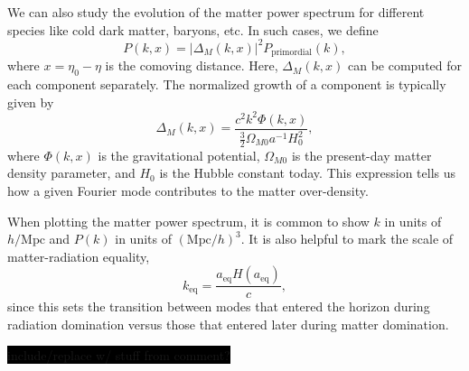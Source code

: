 \documentclass{aa}
\numberwithin{equation}{section}
\numberwithin{table}{section}
\numberwithin{figure}{section}
\begin{document}
We can also study the evolution of the matter power spectrum for different species like cold dark matter, baryons, etc. In such cases, we define
\begin{equation}
P(k, x) = |\Delta_M(k, x)|^2 P_\text{primordial}(k),
\end{equation}
where $x = \eta_0 - \eta$ is the comoving distance. Here, $\Delta_M(k, x)$ can be computed for each component separately. The normalized growth of a component is typically given by
\begin{equation}
\Delta_M(k, x) = \frac{c^2 k^2 \Phi(k,x)}{\frac{3}{2} \Omega_{M0} a^{-1} H_0^2},
\end{equation}
where $\Phi(k,x)$ is the gravitational potential, $\Omega_{M0}$ is the present-day matter density parameter, and $H_0$ is the Hubble constant today. This expression tells us how a given Fourier mode contributes to the matter over-density.

When plotting the matter power spectrum, it is common to show $k$ in units of $h/\text{Mpc}$ and $P(k)$ in units of $(\text{Mpc}/h)^3$. It is also helpful to mark the scale of matter-radiation equality,
\begin{equation}
k_\text{eq} = \frac{a_\text{eq} H(a_\text{eq})}{c},
\end{equation}
since this sets the transition between modes that entered the horizon during radiation domination versus those that entered later during matter domination.

\colorbox{black}{include/replace w/ stuff from comment?}
\color{black}



\end{document}
